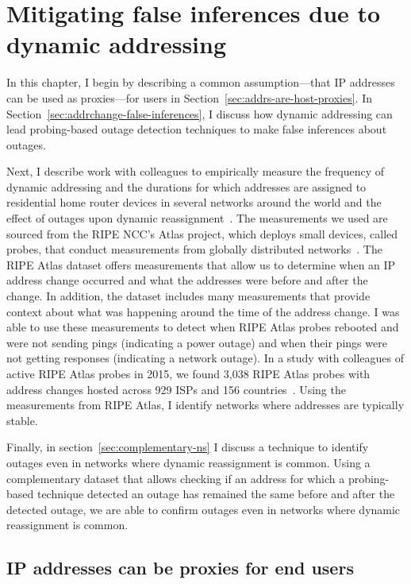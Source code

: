 
\chapter{Mitigating false inferences due to dynamic addressing}

\label{cpt:addr_change}


In this chapter, I begin by describing a common assumption---that IP
addresses can be used as proxies---for users in
Section~\ref{sec:addrs-are-host-proxies}. In
Section~\ref{sec:addrchange-false-inferences}, I discuss how dynamic
addressing can lead probing-based outage detection techniques to make
false inferences about outages.

Next, I describe work with colleagues to empirically
measure the frequency of dynamic addressing and the durations for
which addresses are assigned to residential home router devices in
several networks around the world and the effect of outages upon
dynamic reassignment~\cite{addrchange-reasons}. The measurements we
used are sourced from the RIPE NCC's Atlas project, which deploys small devices, called probes, that
conduct measurements from globally distributed
networks~\cite{atlas}. The RIPE Atlas dataset offers measurements that allow us to
determine when an IP address change occurred and what the addresses
were before and after the change. In addition, the dataset includes many
measurements that provide context about what was happening around the
time of the address change. I was able to use these measurements to
detect when RIPE Atlas probes rebooted and were not sending pings
(indicating a power outage) and when their pings were not getting
responses (indicating a network outage). In a study with colleagues of active RIPE
Atlas probes in 2015, we found 3,038 RIPE Atlas probes with address
changes hosted across 929 ISPs and 156
countries~\cite{addrchange-reasons}. Using the measurements from RIPE Atlas, I identify networks
where addresses are typically stable. 

Finally, in section~\ref{sec:complementary-ns} I discuss a technique to identify outages even in networks
where dynamic reassignment is common. Using a complementary dataset
that allows checking if an address for which a probing-based technique
detected an outage has remained the same before and after the detected
outage, we are able to confirm outages even in networks where dynamic
reassignment is common.

\section{IP addresses can be proxies for end users}

